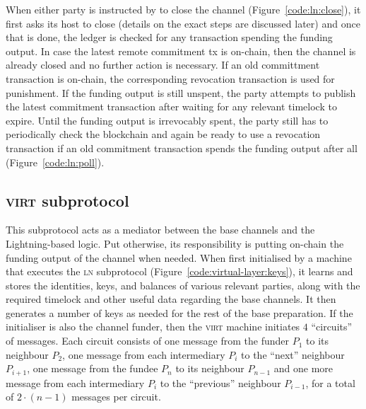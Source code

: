   When either party is instructed by \environment to close the channel
  (Figure~\ref{code:ln:close}), it first asks its host to close (details on the
  exact steps are discussed later) and once that is done, the ledger is checked
  for any transaction spending the funding output. In case the latest remote
  commitment tx is on-chain, then the channel is already closed and no further
  action is necessary. If an old committment transaction is on-chain, the
  corresponding revocation transaction is used for punishment. If the funding
  output is still unspent, the party attempts to publish the latest commitment
  transaction after waiting for any relevant timelock to expire. Until the
  funding output is irrevocably spent, the party still has to periodically check
  the blockchain and again be ready to use a revocation transaction if an old
  commitment transaction spends the funding output after all
  (Figure~\ref{code:ln:poll}).

\subsection{\textsc{virt} subprotocol}
  This subprotocol acts as a mediator between the base channels and the
  Lightning-based logic. Put otherwise, its responsibility is putting on-chain
  the funding output of the channel when needed. When first initialised by a
  machine that executes the \textsc{ln} subprotocol
  (Figure~\ref{code:virtual-layer:keys}), it learns and stores the identities,
  keys, and balances of various relevant parties, along with the required
  timelock and other useful data regarding the base channels. It then generates
  a number of keys as needed for the rest of the base preparation. If the
  initialiser is also the channel funder, then the \textsc{virt} machine
  initiates $4$ ``circuits'' of messages. Each circuit consists of one message
  from the funder $P_1$ to its neighbour $P_2$, one message from each
  intermediary $P_i$ to the ``next'' neighbour $P_{i+1}$, one message from the
  fundee $P_n$ to its neighbour $P_{n-1}$ and one more message from each
  intermediary $P_i$ to the ``previous'' neighbour $P_{i-1}$, for a total of
  $2\cdot(n-1)$ messages per circuit.

